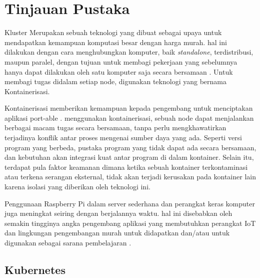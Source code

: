 \section{Tinjauan Pustaka}

Kluster Merupakan sebuah teknologi yang dibuat sebagai upaya untuk mendapatkan kemampuan komputasi besar dengan harga murah. hal ini dilakukan dengan cara menghubungkan komputer, baik \textit{standalone}, terdistribusi, maupun paralel, dengan tujuan untuk membagi pekerjaan yang sebelumnya hanya dapat dilakukan oleh satu komputer saja secara bersamaan \cite{cloud_computing}. Untuk membagi tugas didalam setiap node, digunakan teknologi yang bernama Kontainerisasi.

\vspace{0.2cm}
\noindent Kontainerisasi memberikan kemampuan kepada pengembang untuk menciptakan aplikasi port-able \cite{containers}. menggunakan kontainerisasi, sebuah node dapat menjalankan berbagai macam tugas secara bersamaan, tanpa perlu mengkhawatirkan terjadinya konflik antar proses mengenai sumber daya yang ada. Seperti versi program yang berbeda, pustaka program yang tidak dapat ada secara bersamaan, dan kebutuhan akan integrasi kuat antar program di dalam kontainer. Selain itu, terdapat pula faktor keamanan dimana ketika sebuah kontainer terkontaminasi atau terkena serangan eksternal, tidak akan terjadi kerusakan pada kontainer lain karena isolasi yang diberikan oleh teknologi ini.

\vspace{0.2cm}
\noindent Penggunaan Raspberry Pi dalam server sederhana dan perangkat keras komputer juga meningkat seiring dengan berjalannya waktu. hal ini disebabkan oleh semakin tingginya angka pengembang aplikasi yang membutuhkan perangkat IoT dan lingkungan pengembangan murah untuk didapatkan dan/atau untuk digunakan sebagai sarana pembelajaran \cite{raspi_market}.

\subsection{Kubernetes}

